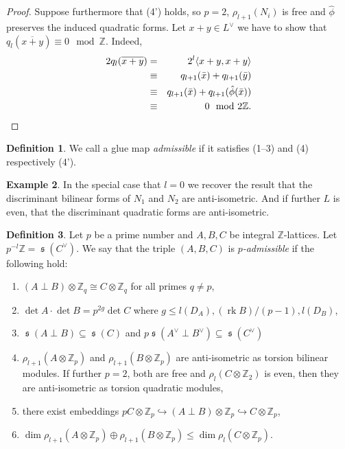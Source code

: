 \documentclass[a4paper]{amsart}
\theoremstyle{definition}
\newtheorem{definition}{Definition}[section]
\newtheorem{example}[definition]{Example}
\theoremstyle{plain}
\DeclareMathOperator{\rk}{rk}
\DeclareMathOperator{\scale}{\mathfrak{s}}
\newcommand{\ZZ}{\mathbb{Z}}
\newcommand{\disc}[1]{{D_{#1}}}
\newcommand{\sprodbq}[1]{\langle #1, #1 \rangle}
\begin{document}
\begin{proof}
Suppose furthermore that (4') holds, so $p=2$, $\rho_{l+1}(N_i)$ is free and $\hat \phi$ preserves the induced quadratic forms. Let $x+y \in L^\vee$ we have to show that $q_l(\overline{x+y})\equiv 0 \mod \ZZ$.
Indeed,
\begin{eqnarray*}
2q_l(\overline{x+y})
&=& 2^{l} \sprodbq{x+y}{}\\
&\equiv& q_{l+1}(\bar x)+q_{l+1}(\bar y)\\
&\equiv&
q_{l+1}(\bar x)+q_{l+1}(\hat \phi(\bar x)) \\
&\equiv& 0 \mod 2 \ZZ.
\qedhere
\end{eqnarray*}
\end{proof}

\begin{definition}\label{def:admissible-glue-map}
 We call a glue map \emph{admissible} if it satisfies 
(1--3) and (4) respectively (4').
\end{definition}


\begin{example}
 In the special case that $l=0$ we recover the result that the discriminant bilinear forms of $N_1$ and $N_2$ are anti-isometric.
 And if further $L$ is even, that the discriminant quadratic forms are anti-isometric.
\end{example}


%
%
%
%
%
%
%
%
%
%
%
%
%
%
%
%
%
%
%
%
%
%
%
%
%
%
%
%
%
%
%
%
%
%
%
%
%
%
%
%
%
%
%
%
%
%
%
%
%
%
%
%
%
%
%
%
%
%
%
%
%
%


\begin{definition}
 Let $p$ be a prime number and $A,B,C$ be integral $\ZZ$-lattices. Let $p^{-l}\ZZ =\scale(C^\vee)$.
 We say that the triple $(A,B,C)$ is
 \emph{$p$-admissible} if the following hold:
 \begin{enumerate}\setlength{\itemsep3pt}
  \item $(A  \perp B) \otimes \ZZ_q \cong C \otimes \ZZ_q$ for all primes $q\neq p$,
  \item $\det A\cdot \det B=p^{2g}\det C$ where $g \leq l(D_A),(\rk B)/(p-1),l(\disc{B})$,
  \item $\scale(A \perp B)\subseteq \scale(C)$ and $p \scale(A^\vee \perp B^\vee) \subseteq \scale(C^\vee)$
  \item $\rho_{l+1}(A\otimes \ZZ_p)$ and $\rho_{l+1}(B\otimes \ZZ_p)$ are anti-isometric as torsion bilinear modules. If further $p=2$, both are free and $\rho_l(C\otimes \ZZ_2)$ is even, then they are anti-isometric as torsion quadratic modules,
  \item there exist embeddings $pC\otimes \ZZ_p \hookrightarrow (A \perp B) \otimes \ZZ_p \hookrightarrow C\otimes \ZZ_p$,
  \item $\dim \rho_{l+1}(A\otimes \ZZ_p)\oplus \rho_{l+1}(B \otimes \ZZ_p) \leq \dim \rho_l(C \otimes \ZZ_p)$.
 \end{enumerate}
\end{definition}
\end{document}
